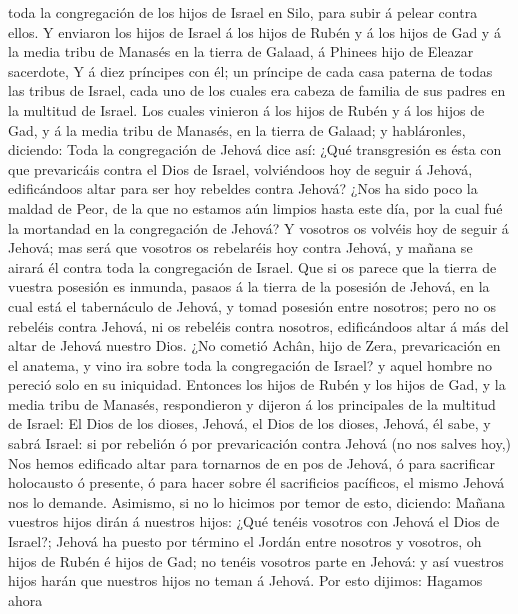 toda la congregación de los hijos de Israel en Silo, para subir á pelear
contra ellos.  Y enviaron los hijos de Israel á los hijos
de Rubén y á los hijos de Gad y á la media tribu de Manasés en la tierra
de Galaad, á Phinees hijo de Eleazar sacerdote,  Y á diez
príncipes con él; un príncipe de cada casa paterna de todas las tribus
de Israel, cada uno de los cuales era cabeza de familia de sus padres en
la multitud de Israel.  Los cuales vinieron á los hijos de
Rubén y á los hijos de Gad, y á la media tribu de Manasés, en la tierra
de Galaad; y habláronles, diciendo:  Toda la congregación
de Jehová dice así: ¿Qué transgresión es ésta con que prevaricáis contra
el Dios de Israel, volviéndoos hoy de seguir á Jehová, edificándoos
altar para ser hoy rebeldes contra Jehová?  ¿Nos ha sido
poco la maldad de Peor, de la que no estamos aún limpios hasta este día,
por la cual fué la mortandad en la congregación de Jehová? 
Y vosotros os volvéis hoy de seguir á Jehová; mas será que vosotros os
rebelaréis hoy contra Jehová, y mañana se airará él contra toda la
congregación de Israel.  Que si os parece que la tierra de
vuestra posesión es inmunda, pasaos á la tierra de la posesión de
Jehová, en la cual está el tabernáculo de Jehová, y tomad posesión entre
nosotros; pero no os rebeléis contra Jehová, ni os rebeléis contra
nosotros, edificándoos altar á más del altar de Jehová nuestro Dios.
 ¿No cometió Achân, hijo de Zera, prevaricación en el
anatema, y vino ira sobre toda la congregación de Israel? y aquel hombre
no pereció solo en su iniquidad.  Entonces los hijos de
Rubén y los hijos de Gad, y la media tribu de Manasés, respondieron y
dijeron á los principales de la multitud de Israel:  El
Dios de los dioses, Jehová, el Dios de los dioses, Jehová, él sabe, y
sabrá Israel: si por rebelión ó por prevaricación contra Jehová (no nos
salves hoy,)  Nos hemos edificado altar para tornarnos de
en pos de Jehová, ó para sacrificar holocausto ó presente, ó para hacer
sobre él sacrificios pacíficos, el mismo Jehová nos lo demande.
 Asimismo, si no lo hicimos por temor de esto, diciendo:
Mañana vuestros hijos dirán á nuestros hijos: ¿Qué tenéis vosotros con
Jehová el Dios de Israel?;  Jehová ha puesto por término el
Jordán entre nosotros y vosotros, oh hijos de Rubén é hijos de Gad; no
tenéis vosotros parte en Jehová: y así vuestros hijos harán que nuestros
hijos no teman á Jehová.  Por esto dijimos: Hagamos ahora
